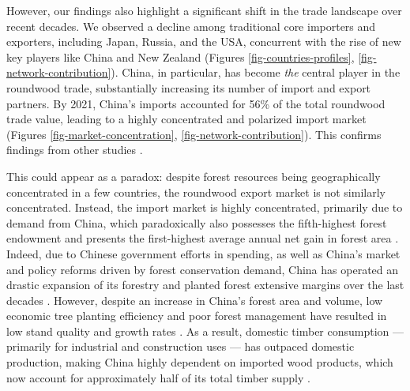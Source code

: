 \documentclass[
  authoryear,
  review,
  3p]{elsarticle}
\begin{document}
However, our findings also highlight a significant shift in the trade
landscape over recent decades. We observed a decline among traditional
core importers and exporters, including Japan, Russia, and the USA,
concurrent with the rise of new key players like China and New Zealand
(Figures \ref{fig-countries-profiles}, \ref{fig-network-contribution}).
China, in particular, has become \emph{the} central player in the
roundwood trade, substantially increasing its number of import and
export partners. By 2021, China's imports accounted for 56\% of the
total roundwood trade value, leading to a highly concentrated and
polarized import market (Figures \ref{fig-market-concentration},
\ref{fig-network-contribution}). This confirms findings from other
studies
\citep{long_exploring_2019, zhou_spatial_2021, shen_structural_2022, huang_static_2024}.

This could appear as a paradox: despite forest resources being
geographically concentrated in a few countries, the roundwood export
market is not similarly concentrated. Instead, the import market is
highly concentrated, primarily due to demand from China, which
paradoxically also possesses the fifth-highest forest endowment and
presents the first-highest average annual net gain in forest area
\citep{fao_state_2024}. Indeed, due to Chinese government efforts in
spending, as well as China's market and policy reforms driven by forest
conservation demand, China has operated an drastic expansion of its
forestry and planted forest extensive margins over the last decades
\citep{demurger_forest_2009, zhang_chinas_2019, zhao_large-scale_2022}.
However, despite an increase in China's forest area and volume, low
economic tree planting efficiency and poor forest management have
resulted in low stand quality and growth rates
\citep{hoffmann_adapting_2018, hou_intensifying_2019, zhang_chinas_2019}.
As a result, domestic timber consumption --- primarily for industrial
and construction uses --- has outpaced domestic production, making China
highly dependent on imported wood products, which now account for
approximately half of its total timber supply
\citep{demurger_forest_2009, he_projection_2011, hoffmann_adapting_2018, hou_intensifying_2019}.
\end{document}
